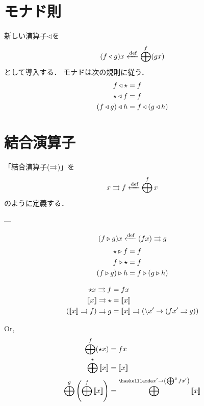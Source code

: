 \documentclass[twocolumn]{jsbook}
\newcommand{\listtype}[1]{[#1]}
\begin{document}



\section{モナド則}

新しい演算子$\triangleleft$を$$(f\triangleleft g)x\xleftarrow{\text{def}}\bigoplus^f(gx)$$として導入する．
モナドは次の規則に従う．
\begin{align}
f\triangleleft\star&=f\\
\star\triangleleft f&=f\\
(f\triangleleft g)\triangleleft h&=f\triangleleft(g\triangleleft h)
\end{align}

\section{結合演算子}

「結合演算子($\rightrightarrows$)」を$$x\rightrightarrows f\xleftarrow{\text{def}} \bigoplus^fx$$のように定義する．

---

$$(f\triangleright g)x\xleftarrow{\text{def}}(fx)\rightrightarrows g$$
\begin{align}
\star\triangleright f&=f\\
f\triangleright\star&=f\\
(f\triangleright g)\triangleright h&=f\triangleright(g\triangleright h)
\end{align}

\begin{align}
\unit x\bind f&=fx\\
\monad{x}\bind\unit&=\monad{x}\\
(\monad{x}\bind f)\bind g&=\monad{x}\bind(\haskelllambda x'\rightarrow(fx'\bind g))
\end{align}

Or,
\begin{align}
\monadfunc^f(\unit x)&=fx\\
\monadfunc^\unit\monad{x}&=\monad{x}\\
\monadfunc^g\left(\monadfunc^f\monad{x}\right)&=\monadfunc^{\haskelllamda x'\rightarrow\left(\monadfunc^gfx'\right)}\monad{x}
\end{align}
\end{document}

